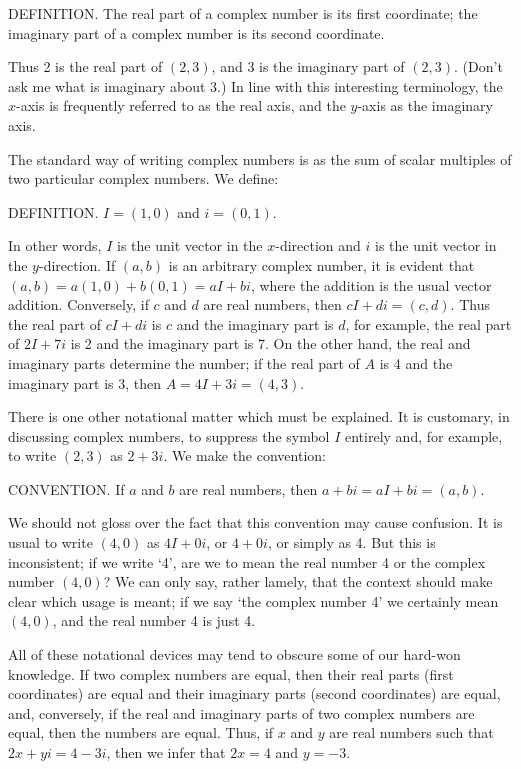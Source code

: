 \documentclass[a4paper]{article}
\begin{document}
DEFINITION. The real part of a complex number is its first coordinate; the imaginary part of a complex number is its second
coordinate.

Thus 2 is the real part of $(2,3)$, and 3 is the imaginary part of $(2,3)$. (Don't ask me what is imaginary about 3.) In line
with this interesting terminology, the $x$-axis is frequently referred to as the real axis, and the $y$-axis as the imaginary axis.

The standard way of writing complex numbers is as the sum of scalar multiples of two particular complex numbers. We define:

DEFINITION. $I=(1,0)$ and $i=(0,1)$.

In other words, $I$ is the unit vector in the $x$-direction and $i$ is the unit vector in the $y$-direction. If $(a,b)$ is
an arbitrary complex number, it is evident that $(a, b) = a(1,0)+b(0,1)=aI+bi$, where the addition is the usual vector addition.
Conversely, if $c$ and $d$ are real numbers, then $cI+di=(c,d)$. Thus the real part of $cI+di$ is $c$ and the imaginary part is
$d$, for example, the real part of $2I+7i$ is 2 and the imaginary part is 7. On the other hand, the real and imaginary parts
determine the number; if the real part of $A$ is 4 and the imaginary part is 3, then $A=4I+3i=(4,3)$.

There is one other notational matter which must be explained. It is customary, in discussing complex numbers, to suppress the
symbol $I$ entirely and, for example, to write $(2,3)$ as $2+3i$. We make the convention:

CONVENTION. If $a$ and $b$ are real numbers, then $a+bi=aI+bi=(a,b)$.

We should not gloss over the fact that this convention may cause confusion. It is usual to write $(4,0)$ as $4I+0i$, or $4+0i$,
or simply as 4. But this is inconsistent; if we write `4', are we to mean the real number 4 or the complex number $(4,0)$? We
can only say, rather lamely, that the context should make clear which usage is meant; if we say `the complex number 4' we certainly
mean $(4,0)$, and the real number 4 is just 4.

All of these notational devices may tend to obscure some of our hard-won knowledge. If two complex numbers are equal, then their real
parts (first coordinates) are equal and their imaginary parts (second coordinates) are equal, and, conversely, if the real and
imaginary parts of two complex numbers are equal, then the numbers are equal. Thus, if $x$ and $y$ are real numbers such that
$2x+yi=4-3i$, then we infer that $2x=4$ and $y=-3$.
\end{document}
